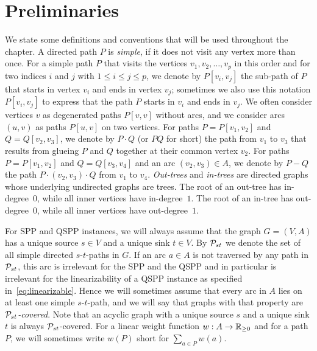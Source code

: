 \section{Preliminaries}
\label{sec:preliminearies}
We state some definitions and conventions that will be used throughout the chapter.
A directed path $P$ is \emph{simple}, if it does not visit any vertex more than once.
For a simple path $P$ that visits the vertices $v_1,v_2,\ldots,v_p$ in this order and 
for two indices $i$ and $j$ with $1\le i\le j\le p$, we denote by $P[v_i,v_j]$ the 
sub-path of $P$ that starts in vertex $v_i$ and ends in vertex $v_j$;
sometimes we also use this notation $P[v_i,v_j]$ to express that the path $P$ starts 
in $v_i$ and ends in $v_j$.
We often consider vertices $v$ as degenerated paths $P[v,v]$ without arcs,
and we consider arcs $(u,v)$ as paths $P[u,v]$ on two vertices.
For paths $P=P[v_1,v_2]$ and $Q=Q[v_2,v_3]$, we denote by $P\cdot Q$ (or $PQ$ for short) the path 
from $v_1$ to $v_3$ that results from glueing $P$ and $Q$ together at their common vertex $v_2$.
For paths $P=P[v_1,v_2]$ and $Q=Q[v_3,v_4]$ and an arc $(v_2,v_3)\in A$, we denote by $P-Q$ 
the path $P\cdot(v_2,v_3)\cdot Q$ from $v_1$ to $v_4$.
\emph{Out-trees} and \emph{in-trees} are directed graphs whose underlying undirected graphs are trees.
The root of an out-tree has  in-degree~$0$, while all inner vertices have  in-degree~$1$.
The root of an  in-tree has out-degree~$0$, while all inner vertices have out-degree~$1$.

For SPP and QSPP instances, we will always assume that the graph $G=(V,A)$ has a unique source $s\in V$ 
and a unique sink $t\in V$. 
By ${\cal P}_{st}$ we denote the set of all simple directed $s$-$t$-paths in $G$.
If an arc $a\in A$ is not traversed by any path in ${\cal P}_{st}$, this arc is irrelevant for
the SPP and the QSPP and in particular is irrelevant for the linearizability of a QSPP 
instance as specified in~\eqref{eq:linearizable}.
Hence we will sometimes assume that every arc in $A$ lies on at least one simple $s$-$t$-path,
and we will say that graphs with that property are \emph{${\cal P}_{st}$-covered}.
Note that an acyclic graph with a unique source $s$ and a unique sink $t$ is always ${\cal P}_{st}$-covered.
For a linear weight function $w:A\to{\mathbb{R}_{\ge0}}$ and for a path $P$, we will sometimes write $w(P)$
short for $\sum_{a\in P}w(a)$.


\medskip
